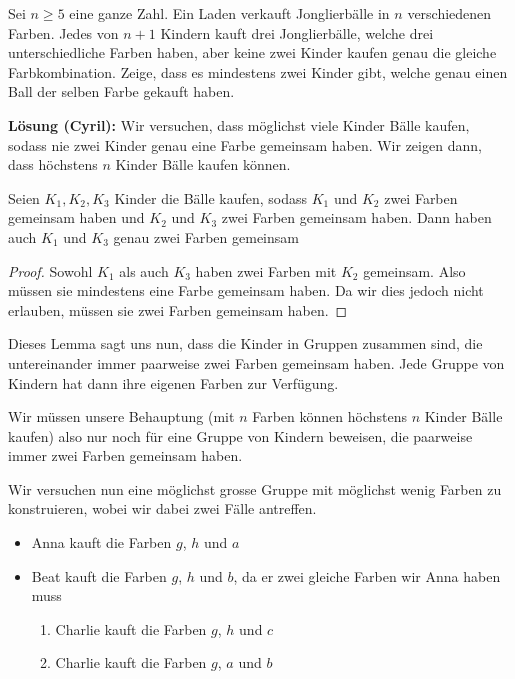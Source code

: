 Sei $n\geq 5$ eine ganze Zahl. Ein Laden verkauft Jonglierbälle in $n$ verschiedenen Farben. Jedes von $n+1$ Kindern kauft drei Jonglierbälle, welche drei unterschiedliche Farben haben, aber keine zwei Kinder kaufen genau die gleiche Farbkombination. Zeige, dass es mindestens zwei Kinder gibt, welche genau einen Ball der selben Farbe gekauft haben.

\textbf{Lösung (Cyril):}
Wir versuchen, dass möglichst viele Kinder Bälle kaufen, sodass nie zwei Kinder genau eine Farbe gemeinsam haben. Wir zeigen dann, dass höchstens $n$ Kinder Bälle kaufen können.

\begin{lem}
Seien $K_1, K_2, K_3$ Kinder die Bälle kaufen, sodass $K_1$ und $K_2$ zwei Farben gemeinsam haben und $K_2$ und $K_3$ zwei Farben gemeinsam haben. Dann haben auch $K_1$ und $K_3$ genau zwei Farben gemeinsam
\end{lem}
\begin{proof}
Sowohl $K_1$ als auch $K_3$ haben zwei Farben mit $K_2$ gemeinsam. Also müssen sie mindestens eine Farbe gemeinsam haben. Da wir dies jedoch nicht erlauben, müssen sie zwei Farben gemeinsam haben.
\end{proof}

Dieses Lemma sagt uns nun, dass die Kinder in Gruppen zusammen sind, die untereinander immer paarweise zwei Farben gemeinsam haben. Jede Gruppe von Kindern hat dann ihre eigenen Farben zur Verfügung.

Wir müssen unsere Behauptung (mit $n$ Farben können höchstens $n$ Kinder Bälle kaufen) also nur noch für eine Gruppe von Kindern beweisen, die paarweise immer zwei Farben gemeinsam haben.

Wir versuchen nun eine möglichst grosse Gruppe mit möglichst wenig Farben zu konstruieren, wobei wir dabei zwei Fälle antreffen.
\begin{itemize}
    \item Anna kauft die Farben $g$, $h$ und $a$
    \item Beat kauft die Farben $g$, $h$ und $b$, da er zwei gleiche Farben wir Anna haben muss
    \begin{enumerate}
        \item Charlie kauft die Farben $g$, $h$ und $c$
        \item Charlie kauft die Farben $g$, $a$ und $b$
    \end{enumerate}
\end{itemize}

